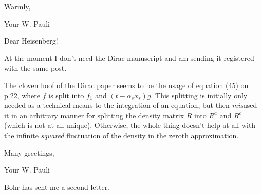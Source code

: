 \documentclass{article}
\begin{document}
Warmly,

Your W. Pauli

\date{February 26, 1934}

Dear Heisenberg!

At the moment I don't need the Dirac manuscript and am sending it registered with the same post.

The cloven hoof of the Dirac paper seems to be the usage of equation (45) on p.22, where $f$ is split into $f_1$ and $(t-\alpha_s x_s)g$. This splitting is initially only needed as a technical means to the integration of an equation, but then \textit{mis}used it in an arbitrary manner for splitting the density matrix $R$ into $R^a$ and $R^c$ (which is not at all unique). Otherwise, the whole thing doesn't help at all with the infinite \textit{squared} fluctuation of the density in the zeroth approximation.

Many greetings,

Your W. Pauli

Bohr has sent me a second letter.
\end{document}
